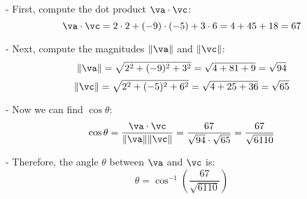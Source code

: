 \begin{sol}
\begin{enumerate}
        - First, compute the dot product $\va \cdot \vc$:
          \[
          \va \cdot \vc = 2 \cdot 2 + (-9) \cdot (-5) + 3 \cdot 6 = 4 + 45 + 18 = 67
          \]

        - Next, compute the magnitudes $\|\va\|$ and $\|\vc\|$:
          \[
          \|\va\| = \sqrt{2^2 + (-9)^2 + 3^2} = \sqrt{4 + 81 + 9} = \sqrt{94}
          \]
          \[
          \|\vc\| = \sqrt{2^2 + (-5)^2 + 6^2} = \sqrt{4 + 25 + 36} = \sqrt{65}
          \]

        - Now we can find $\cos \theta$:
          \[
          \cos \theta = \frac{\va \cdot \vc}{\|\va\| \|\vc\|} = \frac{67}{\sqrt{94} \cdot \sqrt{65}} = \frac{67}{\sqrt{6110}}
          \]

        - Therefore, the angle $\theta$ between $\va$ and $\vc$ is:
          \[
          \theta = \cos^{-1} \left( \frac{67}{\sqrt{6110}} \right)
          \] 
    \end{enumerate}
\end{sol}






